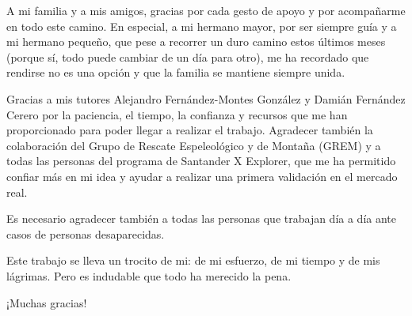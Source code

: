 \documentclass{pclass}
\begin{document}
\setlength{\parskip}{4ex}
\dia{\large \today}

\hacerportada

	
\frontmatter


A mi familia y a mis amigos, gracias por cada gesto de apoyo y por acompañarme en todo este camino. En especial, a mi hermano mayor, por ser siempre guía y a mi hermano pequeño, que pese a recorrer un duro camino estos últimos meses (porque sí, todo puede cambiar de un día para otro), me ha recordado que rendirse no es una opción y que la familia se mantiene siempre unida.

Gracias a mis tutores Alejandro Fernández-Montes González y Damián Fernández Cerero por la paciencia, el tiempo, la confianza y recursos que me han proporcionado para poder llegar a realizar el trabajo. Agradecer también la colaboración del Grupo de Rescate Espeleológico y de Montaña (GREM) y a todas las personas del programa de Santander X Explorer, que me ha permitido confiar más en mi idea y ayudar a realizar una primera validación en el mercado real.

Es necesario agradecer también a todas las personas que trabajan día a día ante casos de personas desaparecidas.

Este trabajo se lleva un trocito de mi: de mi esfuerzo, de mi tiempo y de mis lágrimas. Pero es indudable que todo ha merecido la pena.

{\centering ¡Muchas gracias! \par}

 

\end{document}

